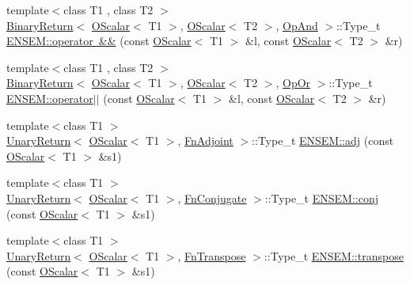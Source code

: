 \begin{DoxyCompactItemize}
{\footnotesize template$<$class T1 , class T2 $>$ }\\\mbox{\hyperlink{structENSEM_1_1BinaryReturn}{Binary\+Return}}$<$ \mbox{\hyperlink{classENSEM_1_1OScalar}{O\+Scalar}}$<$ T1 $>$, \mbox{\hyperlink{classENSEM_1_1OScalar}{O\+Scalar}}$<$ T2 $>$, \mbox{\hyperlink{structENSEM_1_1OpAnd}{Op\+And}} $>$\+::Type\+\_\+t \mbox{\hyperlink{group__obsscalar_ga7e3b0e4d68793d07ed6616df54117609}{E\+N\+S\+E\+M\+::operator \&\&}} (const \mbox{\hyperlink{classENSEM_1_1OScalar}{O\+Scalar}}$<$ T1 $>$ \&l, const \mbox{\hyperlink{classENSEM_1_1OScalar}{O\+Scalar}}$<$ T2 $>$ \&r)
\item 
{\footnotesize template$<$class T1 , class T2 $>$ }\\\mbox{\hyperlink{structENSEM_1_1BinaryReturn}{Binary\+Return}}$<$ \mbox{\hyperlink{classENSEM_1_1OScalar}{O\+Scalar}}$<$ T1 $>$, \mbox{\hyperlink{classENSEM_1_1OScalar}{O\+Scalar}}$<$ T2 $>$, \mbox{\hyperlink{structENSEM_1_1OpOr}{Op\+Or}} $>$\+::Type\+\_\+t \mbox{\hyperlink{group__obsscalar_gae6474aecd45d7fea902ccc4db61bfaaa}{E\+N\+S\+E\+M\+::operator$\vert$$\vert$}} (const \mbox{\hyperlink{classENSEM_1_1OScalar}{O\+Scalar}}$<$ T1 $>$ \&l, const \mbox{\hyperlink{classENSEM_1_1OScalar}{O\+Scalar}}$<$ T2 $>$ \&r)
\item 
{\footnotesize template$<$class T1 $>$ }\\\mbox{\hyperlink{structENSEM_1_1UnaryReturn}{Unary\+Return}}$<$ \mbox{\hyperlink{classENSEM_1_1OScalar}{O\+Scalar}}$<$ T1 $>$, \mbox{\hyperlink{structENSEM_1_1FnAdjoint}{Fn\+Adjoint}} $>$\+::Type\+\_\+t \mbox{\hyperlink{group__obsscalar_ga08302e6d2883f4f095a5e579bce6b2b8}{E\+N\+S\+E\+M\+::adj}} (const \mbox{\hyperlink{classENSEM_1_1OScalar}{O\+Scalar}}$<$ T1 $>$ \&s1)
\item 
{\footnotesize template$<$class T1 $>$ }\\\mbox{\hyperlink{structENSEM_1_1UnaryReturn}{Unary\+Return}}$<$ \mbox{\hyperlink{classENSEM_1_1OScalar}{O\+Scalar}}$<$ T1 $>$, \mbox{\hyperlink{structENSEM_1_1FnConjugate}{Fn\+Conjugate}} $>$\+::Type\+\_\+t \mbox{\hyperlink{group__obsscalar_gad6c32f4ab79b8017fc993162435d1d72}{E\+N\+S\+E\+M\+::conj}} (const \mbox{\hyperlink{classENSEM_1_1OScalar}{O\+Scalar}}$<$ T1 $>$ \&s1)
\item 
{\footnotesize template$<$class T1 $>$ }\\\mbox{\hyperlink{structENSEM_1_1UnaryReturn}{Unary\+Return}}$<$ \mbox{\hyperlink{classENSEM_1_1OScalar}{O\+Scalar}}$<$ T1 $>$, \mbox{\hyperlink{structENSEM_1_1FnTranspose}{Fn\+Transpose}} $>$\+::Type\+\_\+t \mbox{\hyperlink{group__obsscalar_ga6af2d66b673bc2683558f88c9eac327e}{E\+N\+S\+E\+M\+::transpose}} (const \mbox{\hyperlink{classENSEM_1_1OScalar}{O\+Scalar}}$<$ T1 $>$ \&s1)

\end{DoxyCompactItemize}
